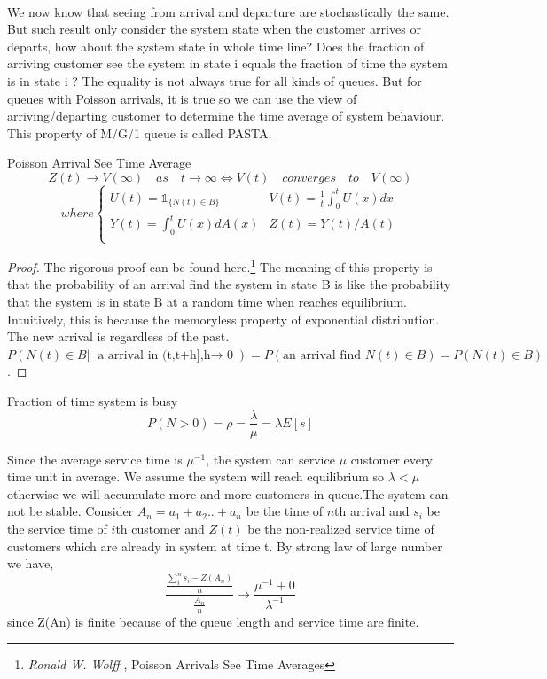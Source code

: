 \documentclass[project2.tex]{subfiles}
\begin{document}
\paragraph{}
We now know that seeing from arrival and departure are stochastically the same. But such result only consider the system state when the customer arrives or departs, how about the system state in whole time line? Does the fraction of arriving customer see the system in state i equals the fraction of time the system is in state i ? The equality is not always true for all kinds of queues. But for queues with Poisson arrivals, it is true so we can use the view of arriving/departing customer to determine the time average of system behaviour. This property of M/G/1 queue is called PASTA.        
\begin{property}
Poisson Arrival See Time Average
$$Z(t)\rightarrow V(\infty)\quad as\quad t\rightarrow\infty \iff V(t)\quad converges\quad to\quad V(\infty) $$
 \begin{equation*}
where \left\{
\begin{array}{lcl}
U(t)=\mathbb{1}_{\{N(t)\in B\}} &
V(t)=\frac{1}{t}\int_0^tU(x)dx\\
Y(t)=\int_0^tU(x)dA(x)&
Z(t)=Y(t)/A(t)\\
\end{array} 
\right.
\end{equation*}
\end{property}
 \begin{proof}
The rigorous proof can be found here.\footnote{\emph{Ronald W. Wolff }, Poisson Arrivals See Time Averages} The meaning of this property is that the probability of an arrival find the system in state B is like the probability that the system is in state B at a random time when reaches equilibrium. Intuitively, this is  because the memoryless property of exponential distribution. The new arrival is regardless of the past. $P(N(t)\in B|\text{ a arrival in (t,t+h],h$\rightarrow$ 0})=P(\text{an arrival find } N(t)\in B)=P(N(t)\in B)$.   
\end{proof}
\begin{observation}Fraction of time system is busy
$$P(N>0)=\rho=\frac{\lambda}{\mu}=\lambda E[s]$$
\end{observation}
Since the average service time is $\mu^{-1}$, the system can service $\mu$ customer every time unit in average. We assume the system will reach equilibrium so $\lambda<\mu$ otherwise we will accumulate more and more customers in queue.The system can not be stable. Consider $A_n=a_1+a_2..+a_n$ be the time of $n$th arrival and $s_i$ be the service time of $i$th customer and $Z(t)$ be the non-realized service time of customers which are already in system at time t. By strong law of large number we have, 
$$\frac{\frac{\sum_i^ns_i-Z(A_n)}{n}}{\frac{A_n}{n}}\rightarrow\frac{\mu^{-1}+0}{\lambda^{-1}}$$ since Z(An) is finite because of the queue length and service time are finite.      
\end{document}
